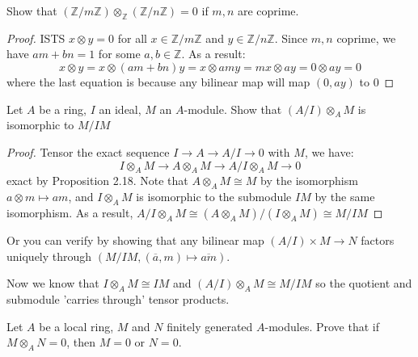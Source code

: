 \documentclass{solution}
\begin{document}
\begin{problem}
    Show that $(\mathbb{Z} / m \mathbb{Z}) \otimes_{\mathbb{Z}} (\mathbb{Z} / n \mathbb{Z}) = 0$ if $m, n$ are coprime.
\end{problem}

\begin{proof}
    ISTS $x \otimes y = 0$ for all $x \in \mathbb{Z} / m \mathbb{Z}$ and $y \in \mathbb{Z} / n \mathbb{Z}$. Since $m, n$ coprime, we have $am + bn = 1$ for some $a, b \in \mathbb{Z}$. As a result:
    $$x \otimes y = x \otimes (am + bn)y = x \otimes amy = mx \otimes ay = 0 \otimes ay = 0$$
    where the last equation is because any bilinear map will map $(0, ay)$ to $0$
\end{proof}

\begin{problem}
    Let $A$ be a ring, $I$ an ideal, $M$ an $A$-module. Show that $(A / I) \otimes_A M$ is isomorphic to $M / IM$
\end{problem}

\begin{proof}
    Tensor the exact sequence $I \rightarrow A \rightarrow A / I \rightarrow 0$ with $M$, we have:
    $$I \otimes_A M \rightarrow A \otimes_A M \rightarrow A / I \otimes_A M \rightarrow 0$$
    exact by Proposition 2.18. Note that $A \otimes_A M \cong M$ by the isomorphism $a \otimes m \mapsto am$, and $I \otimes_A M$ is isomorphic to the submodule $IM$ by the same isomorphism. As a result, $A / I \otimes_A M \cong (A \otimes_A M) / (I \otimes_A M) \cong M / IM$
\end{proof}

Or you can verify by showing that any bilinear map $(A/I) \times M \rightarrow N$ factors uniquely through $(M / IM, (\overline{a}, m) \mapsto \overline{am})$.

Now we know that $I \otimes_A M \cong IM$ and $(A / I) \otimes_A M \cong M / IM$ so the quotient and submodule 'carries through' tensor products.

\begin{problem}
    Let $A$ be a local ring, $M$ and $N$ finitely generated $A$-modules. Prove that if $M \otimes_A N = 0$, then $M = 0$ or $N = 0$.
\end{problem}
\end{document}
